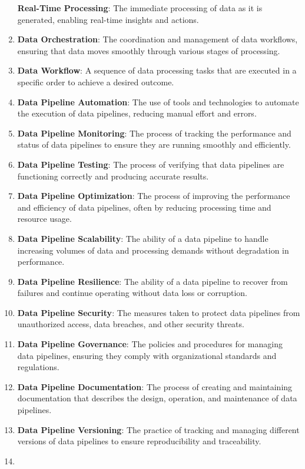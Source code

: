\documentclass[
  letterpaper,
  DIV=11,
  numbers=noendperiod]{scrartcl}
\begin{document}
\begin{enumerate}
  \textbf{Real-Time Processing}: The immediate processing of data as it
  is generated, enabling real-time insights and actions.
\item
  \textbf{Data Orchestration}: The coordination and management of data
  workflows, ensuring that data moves smoothly through various stages of
  processing.
\item
  \textbf{Data Workflow}: A sequence of data processing tasks that are
  executed in a specific order to achieve a desired outcome.
\item
  \textbf{Data Pipeline Automation}: The use of tools and technologies
  to automate the execution of data pipelines, reducing manual effort
  and errors.
\item
  \textbf{Data Pipeline Monitoring}: The process of tracking the
  performance and status of data pipelines to ensure they are running
  smoothly and efficiently.
\item
  \textbf{Data Pipeline Testing}: The process of verifying that data
  pipelines are functioning correctly and producing accurate results.
\item
  \textbf{Data Pipeline Optimization}: The process of improving the
  performance and efficiency of data pipelines, often by reducing
  processing time and resource usage.
\item
  \textbf{Data Pipeline Scalability}: The ability of a data pipeline to
  handle increasing volumes of data and processing demands without
  degradation in performance.
\item
  \textbf{Data Pipeline Resilience}: The ability of a data pipeline to
  recover from failures and continue operating without data loss or
  corruption.
\item
  \textbf{Data Pipeline Security}: The measures taken to protect data
  pipelines from unauthorized access, data breaches, and other security
  threats.
\item
  \textbf{Data Pipeline Governance}: The policies and procedures for
  managing data pipelines, ensuring they comply with organizational
  standards and regulations.
\item
  \textbf{Data Pipeline Documentation}: The process of creating and
  maintaining documentation that describes the design, operation, and
  maintenance of data pipelines.
\item
  \textbf{Data Pipeline Versioning}: The practice of tracking and
  managing different versions of data pipelines to ensure
  reproducibility and traceability.
\item

\end{enumerate}
\end{document}
